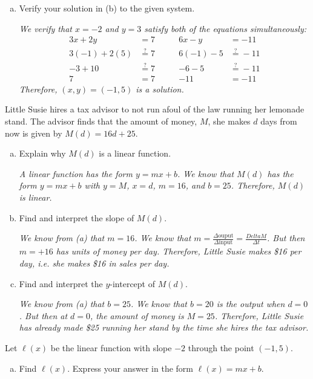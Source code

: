\documentclass[12pt,letterpaper]{exam}
\begin{document}
\begin{questions}
\begin{enumerate}[(a)]
\item Verify your solution in (b) to the given system. \pspace

{\itshape We verify that $x= -2$ and $y= 3$ satisfy both of the equations simultaneously:
	\[
	\begin{aligned}
	3x + 2y&= 7 \qquad& 6x - y&= -11 \\
	3(-1) + 2(5)&\stackrel{?}{=} 7 & 6(-1) - 5&\stackrel{?}{=} -11 \\
	-3 + 10&\stackrel{?}{=} 7 & -6 - 5&\stackrel{?}{=} -11 \\
	7&= 7 & -11&= -11
	\end{aligned}
	\]
Therefore, $(x, y)= (-1, 5)$ is a solution.}
\end{enumerate}



\newpage
\question[15] Little Susie hires a tax advisor to not run afoul of the law running her lemonade stand. The advisor finds that the amount of money, $M$, she makes $d$ days from now is given by $M(d)= 16d + 25$.
	\begin{enumerate}[(a)]
	\item Explain why $M(d)$ is a linear function. \pvspace{2.6cm}
	
	{\itshape A linear function has the form $y= mx + b$. We know that $M(d)$ has the form $y= mx + b$ with $y= M$, $x= d$, $m= 16$, and $b= 25$. Therefore, $M(d)$ is linear.} \pvspace{2.6cm}
	
	\item Find and interpret the slope of $M(d)$. \pvspace{2.32cm}
	
	{\itshape We know from (a) that $m= 16$. We know that $m= \frac{\Delta \text{ouput}}{\Delta \text{input}}= \frac{Delta M}{\Delta t}$. But then $m= +16$ has units of money per day. Therefore, Little Susie makes \$16 per day, i.e. she makes \$16 in sales per day.} \pvspace{2.32cm}
	
	\item Find and interpret the $y$-intercept of $M(d)$. \pvspace{2.4cm}
	
	{\itshape We know from (a) that $b= 25$. We know that $b= 20$ is the output when $d= 0$. But then at $d= 0$, the amount of money is $M= 25$. Therefore, Little Susie has already made \$25 running her stand by the time she hires the tax advisor.} \pvspace{2.32cm}
	\end{enumerate} 



\newpage
\question[15] Let $\ell(x)$ be the linear function with slope $-2$ through the point $(-1, 5)$. 
	\begin{enumerate}[(a)]
	\item Find $\ell(x)$. Express your answer in the form $\ell(x)= mx + b$. \pvspace{0.5cm}
	

\end{enumerate}
\end{questions}
\end{document}
